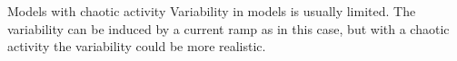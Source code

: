 \documentclass[aspectratio=43]{beamer}
\begin{document}
\begin{frame}{Models with chaotic activity}
	Variability in models is usually limited. The variability can be induced by a current ramp as in this case, but with a chaotic activity the variability could be more realistic. 
	\vspace{8pt}
	\begin{columns}
	\end{columns}
\end{frame}
\end{document}
